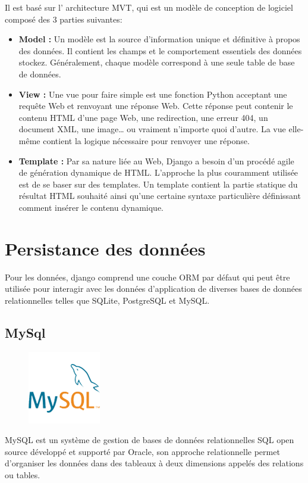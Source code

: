         Il est basé sur l' architecture MVT, qui est un modèle de conception de logiciel composé des 3 parties suivantes:

        \begin{itemize}
            \item[\textbullet] \textbf{Model :} Un modèle est la source d’information unique et définitive à propos des données. Il contient les champs et le comportement essentiels des données stockez. Généralement, chaque modèle correspond à une seule table de base de données\cite{19}.
            \item[\textbullet] \textbf{View :} Une vue pour faire simple est une fonction Python acceptant une requête Web et renvoyant une réponse Web. Cette réponse peut contenir le contenu HTML d’une page Web, une redirection, une erreur 404, un document XML, une image… ou vraiment n’importe quoi d’autre. La vue elle-même contient la logique nécessaire pour renvoyer une réponse\cite{20}.
            \item[\textbullet] \textbf{Template :} Par sa nature liée au Web, Django a besoin d’un procédé agile de génération dynamique de HTML. L’approche la plus couramment utilisée est de se baser sur des templates. Un template contient la partie statique du résultat HTML souhaité ainsi qu’une certaine syntaxe particulière définissant comment insérer le contenu dynamique\cite{21}.
        \end{itemize}
    
\section{Persistance des données}
    Pour les données, django comprend une couche ORM par défaut qui peut être utilisée pour interagir avec les données d'application de diverses bases de données relationnelles telles que SQLite, PostgreSQL et MySQL.
    \subsection{MySql}
            \begin{figure}
                \vspace{-22pt}
              \begin{center}
                 \includegraphics[scale=0.36]{images/logo/mysql.png}
                 \label{fig76}
              \end{center}
              \vspace{-20pt}
              \vspace{-10pt}
            \end{figure}
        MySQL est un système de gestion de bases de données relationnelles SQL open source développé et supporté par Oracle, son approche relationnelle permet d'organiser les données dans des tableaux à deux dimensions appelés des relations ou tables\cite{47}.
        
